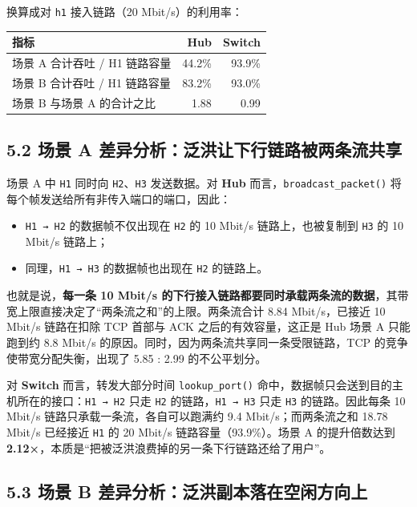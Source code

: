 \documentclass[UTF8,12pt,a4paper,fontset=fandol]{ctexart}
\begin{document}
换算成对 \texttt{h1} 接入链路（20 Mbit/s）的利用率：

\begin{center}
{\small
\begin{tabular}{@{}lrr@{}}
\toprule
\rowcolor{TableHeader}\textbf{指标} & \textbf{Hub} & \textbf{Switch}\\
\midrule
场景 A 合计吞吐 / H1 链路容量 & 44.2\% & 93.9\%\\
场景 B 合计吞吐 / H1 链路容量 & 83.2\% & 93.0\%\\
场景 B 与场景 A 的合计之比 & 1.88 & 0.99\\
\bottomrule
\end{tabular}}
\end{center}

\subsection*{5.2 场景 A 差异分析：泛洪让下行链路被两条流共享}

场景 A 中 \texttt{H1} 同时向 \texttt{H2}、\texttt{H3} 发送数据。对 \textbf{Hub} 而言，\texttt{broadcast_packet()} 将每个帧发送给所有非传入端口的端口，因此：

\begin{itemize}[leftmargin=1.7em]
  \item \texttt{H1 → H2} 的数据帧不仅出现在 \texttt{H2} 的 10 Mbit/s 链路上，也被复制到 \texttt{H3} 的 10 Mbit/s 链路上；
  \item 同理，\texttt{H1 → H3} 的数据帧也出现在 \texttt{H2} 的链路上。
\end{itemize}

也就是说，\textbf{每一条 10 Mbit/s 的下行接入链路都要同时承载两条流的数据}，其带宽上限直接决定了“两条流之和”的上限。两条流合计 8.84 Mbit/s，已接近 10 Mbit/s 链路在扣除 TCP 首部与 ACK 之后的有效容量，这正是 Hub 场景 A 只能跑到约 8.8 Mbit/s 的原因。同时，因为两条流共享同一条受限链路，TCP 的竞争使带宽分配失衡，出现了 5.85 : 2.99 的不公平划分。

对 \textbf{Switch} 而言，转发大部分时间 \texttt{lookup_port()} 命中，数据帧只会送到目的主机所在的接口：\texttt{H1 → H2} 只走 \texttt{H2} 的链路，\texttt{H1 → H3} 只走 \texttt{H3} 的链路。因此每条 10 Mbit/s 链路只承载一条流，各自可以跑满约 9.4 Mbit/s；而两条流之和 18.78 Mbit/s 已经接近 \texttt{H1} 的 20 Mbit/s 链路容量（93.9\%）。场景 A 的提升倍数达到 \textbf{2.12×}，本质是“把被泛洪浪费掉的另一条下行链路还给了用户”。

\subsection*{5.3 场景 B 差异分析：泛洪副本落在空闲方向上}
\end{document}
